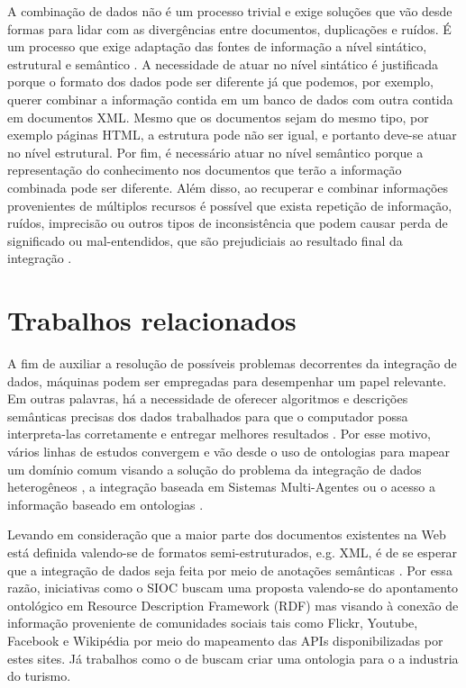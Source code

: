 A combinação de dados não é um processo trivial e exige soluções que vão desde formas para lidar com as divergências entre documentos, duplicações e ruídos. É um processo que exige adaptação das fontes de informação a nível sintático, estrutural e semântico \citep{Vettor2014}. A necessidade de atuar no nível sintático é justificada porque o formato dos dados pode ser diferente já que podemos, por exemplo, querer combinar a informação contida em um banco de dados com outra contida em documentos XML. Mesmo que os documentos sejam do mesmo tipo, por exemplo páginas HTML, a estrutura pode não ser igual, e portanto deve-se atuar no nível estrutural. Por fim, é necessário atuar no nível semântico porque a representação do conhecimento nos documentos que terão a informação combinada pode ser diferente. Além disso, ao recuperar e combinar informações provenientes de múltiplos recursos é possível que exista repetição de informação, ruídos, imprecisão ou outros tipos de inconsistência que podem causar perda de significado ou mal-entendidos, que são prejudiciais ao resultado final da integração \citep{Vettor2014}.

\section{Trabalhos relacionados}
\label{sec:trabalhos_relacionados}

A fim de auxiliar a resolução de possíveis problemas decorrentes da integração de dados, máquinas podem ser empregadas para desempenhar um papel relevante. Em outras palavras, há a necessidade de oferecer algoritmos e descrições semânticas precisas dos dados trabalhados para que o computador possa interpreta-las corretamente e entregar melhores resultados \citep{Vettor2014}. Por esse motivo, vários linhas de estudos convergem e vão desde o uso de ontologias para mapear um domínio comum visando a solução do problema da integração de dados heterogêneos \citep{Ahmed2008}, a integração baseada em Sistemas Multi-Agentes \citep{Sui2009} ou o acesso a informação baseado em ontologias \citep{Civili2013, Lembo2014, Kharlamov2013}.  

Levando em consideração que a maior parte dos documentos existentes na Web está definida valendo-se de formatos semi-estruturados, e.g. XML, é de se esperar que a integração de dados seja feita por meio de anotações semânticas \citep{May}. Por essa razão, iniciativas como o SIOC \citep{Bojars2008} buscam uma proposta valendo-se do apontamento ontológico em Resource Description Framework (RDF) \citep{RDFWorkingGroup2014} mas visando à conexão de informação proveniente de comunidades sociais tais como Flickr, Youtube, Facebook e Wikipédia por meio do mapeamento das APIs disponibilizadas por estes sites. Já trabalhos como o de \citet{Cardoso2006} buscam criar uma ontologia para o a industria do turismo. 

